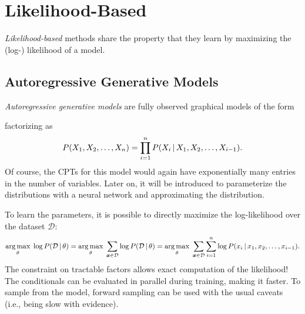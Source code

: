 	\section{Likelihood-Based}
		\emph{Likelihood-based} methods share the property that they learn by maximizing the (log-) likelihood of a model.

		\subsection{Autoregressive Generative Models}
			\emph{Autoregressive generative models} are fully observed graphical models of the form
			\begin{center}
			\end{center}
			factorizing as
			\begin{equation}
				P(X_1, X_2, \dots, X_n) = \prod_{i = 1}^{n} P(X_i \,\vert\, X_1, X_2, \dots, X_{i - 1}).
			\end{equation}
			Of course, the CPTs for this model would again have exponentially many entries in the number of variables. Later on, it will be introduced to parameterize the distributions with a neural network and approximating the distribution.

			To learn the parameters, it is possible to directly maximize the log-likelihood over the dataset \(\mathcal{D}\):
			\begin{equation}
				\operatorname*{arg\,max}_\theta \; \log P(\mathcal{D} \,\vert\, \theta)
				= \operatorname*{arg\,max}_\theta \; \sum_{\bm{x} \in \mathcal{D}} \log P(\mathcal{D} \,\vert\, \theta)
				= \operatorname*{arg\,max}_\theta \; \sum_{\bm{x} \in \mathcal{D}} \sum_{i = 1}^{n} \log P(x_i \,\vert\, x_1, x_2, \dots, x_{i - 1}).
			\end{equation}
			The constraint on tractable factors allows exact computation of the likelihood! The conditionals can be evaluated in parallel during training, making it faster. To sample from the model, forward sampling can be used with the usual caveats (i.e., being slow with evidence).

